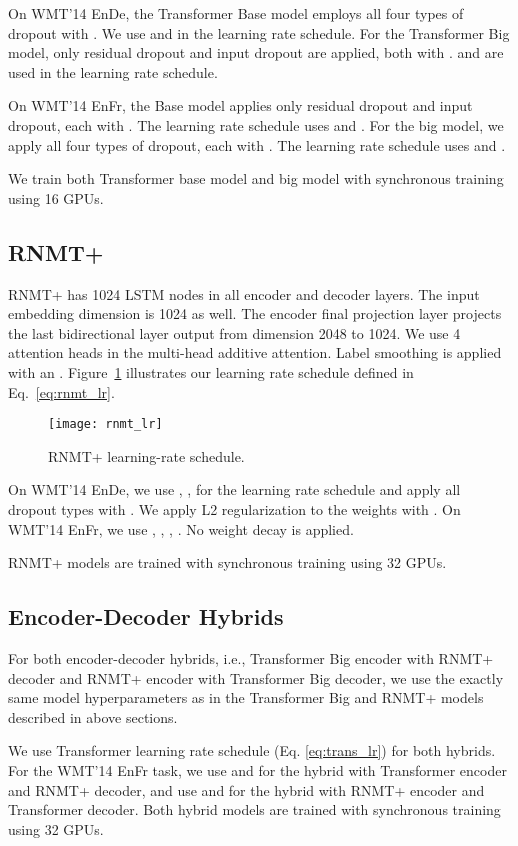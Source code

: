 \documentclass[11pt,a4paper]{article}
\begin{document}
On WMT'14 EnDe, the Transformer Base model employs all
four types of dropout with . We use
 and  in the learning rate schedule. For
the Transformer Big model, only residual dropout and input dropout are
applied, both with .  and 
are used in the learning rate schedule.

On WMT'14 EnFr, the Base model applies only residual dropout and
input dropout, each with . The learning rate
schedule uses  and . For the big model, we apply all four
types of dropout, each with . The learning rate schedule
uses  and .

We train both Transformer base model and big model with synchronous training using 16 GPUs.

\subsection{RNMT+}

RNMT+ has 1024 LSTM nodes in all encoder and decoder layers. The input
embedding dimension is 1024 as well. The encoder final projection layer
projects the last bidirectional layer output from dimension 2048 to 1024. We
use 4 attention heads in the multi-head additive attention. Label smoothing is
applied with an . Figure~\ref{fig:rnmt_lr} illustrates our
learning rate schedule defined in Eq.~\ref{eq:rnmt_lr}.

\begin{figure}[t!]
 \centering
 \texttt{[image: rnmt\_lr]}
 \caption{RNMT+ learning-rate schedule.}
 \label{fig:rnmt_lr}
 \end{figure}

On WMT'14 EnDe, we use , ,  for
the learning rate schedule and apply all dropout types with
.  We apply L2 regularization to the weights with
. On WMT'14 EnFr, we use ,
, , . No weight decay is
applied.

RNMT+ models are trained with synchronous training using 32 GPUs.

\subsection{Encoder-Decoder Hybrids}

For both encoder-decoder hybrids, i.e., Transformer Big encoder
with RNMT+ decoder and RNMT+ encoder with
Transformer Big decoder, we use the exactly same model hyperparameters
as in the Transformer Big and RNMT+ models described in above sections.

We use Transformer learning rate schedule (Eq. \ref{eq:trans_lr}) for both hybrids. For the WMT'14 EnFr task, we use  and  for the hybrid with Transformer encoder and RNMT+ decoder, and use  and  for the hybrid with RNMT+ encoder and Transformer decoder. Both hybrid models are trained with synchronous training using 32 GPUs.
\end{document}
